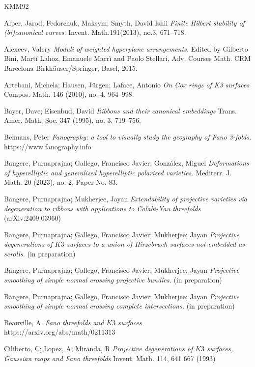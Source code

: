\documentclass[11pt,twoside]{amsart}
\theoremstyle{plain}
\numberwithin{equation}{section}
\theoremstyle{definition}
\begin{document}

\begin{thebibliography}{KMM92}
\color{black}

Alper, Jarod; Fedorchuk, Maksym; Smyth, David Ishii
\emph{Finite Hilbert stability of (bi)canonical curves.}
Invent. Math.191(2013), no.3, 671–718.

Alexeev, Valery 
\emph{Moduli of weighted hyperplane arrangements.}
Edited by Gilberto Bini, Martí Lahoz, Emanuele Macrì and Paolo Stellari, 
Adv. Courses Math. CRM Barcelona
Birkhäuser/Springer, Basel, 2015. 

Artebani, Michela; Hausen, Jürgen; Laface, Antonio
\emph{On Cox rings of K3 surfaces}
Compos. Math. 146 (2010), no. 4, 964–998.

Bayer, Dave; Eisenbud, David
\emph{Ribbons and their canonical embeddings}
Trans. Amer. Math. Soc. 347 (1995), no. 3, 719–756.

Belmans, Peter
\emph{Fanography: a tool to visually study the geography of Fano 3-folds.}
https://www.fanography.info

 Bangere, Purnaprajna; Gallego, Francisco Javier; González, Miguel \emph{Deformations of hyperelliptic and generalized hyperelliptic polarized varieties.}
Mediterr. J. Math. 20 (2023), no. 2, Paper No. 83.
\color{black}

Bangere, Purnaprajna; Mukherjee, Jayan  
\emph{Extendability of projective varieties via degeneration to ribbons with applications to Calabi-Yau threefolds} (arXiv:2409.03960)


 Bangere, Purnaprajna; Gallego, Francisco Javier; Mukherjee; Jayan \emph{Projective degenerations of $K3$ surfaces to a union of Hirzebruch surfaces not embedded as scrolls.} (in preparation)

 Bangere, Purnaprajna; Gallego, Francisco Javier; Mukherjee; Jayan \emph{Projective smoothing of simple normal crossing projective bundles.} (in preparation)

 Bangere, Purnaprajna; Gallego, Francisco Javier; Mukherjee; Jayan \emph{Projective smoothing of simple normal crossing complete intersections.} (in preparation)


Beauville, A. \emph{Fano threefolds and $K3$ surfaces}
https://arxiv.org/abs/math/0211313

Ciliberto, C; Lopez, A; Miranda, R
\emph{Projective degenerations of $K3$ surfaces, Gaussian maps and Fano threefolds}
Invent. Math. 114, 641 667 (1993)


\end{thebibliography}
\end{document}

